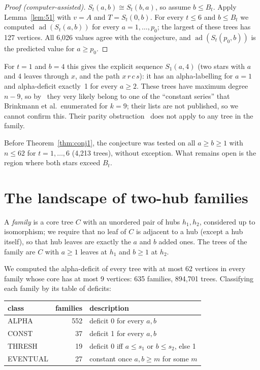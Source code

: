 \documentclass[11pt]{amsart}
\theoremstyle{definition}
\newcommand{\ad}{\operatorname{ad}}
\begin{document}
\begin{proof}[Proof (computer-assisted)]
$S_t(a,b)\cong S_t(b,a)$, so assume $b\le B_t$. Apply Lemma~\ref{lem:51} with $v=A$ and $T=S_t(0,b)$. For every
$t\le 6$ and $b\le B_t$ we computed $\ad(S_t(a,b))$ for every $a=1,\dots,p_0$; the largest of these trees has
127 vertices. All 6{,}026 values agree with the conjecture, and $\ad(S_t(p_0,b))$ is the predicted value for
$a\ge p_0$.
\end{proof}

For $t=1$ and $b=4$ this gives the explicit sequence $S_1(a,4)$ (two stars with $a$ and $4$ leaves through $x$,
and the path $x\,r\,c\,s$): it has an alpha-labelling for $a=1$ and alpha-deficit exactly~1 for every $a\ge 2$.
These trees have maximum degree $n-9$, so by~\cite[Theorem~1.2]{bcmrs} they very likely belong to one of the
``constant series'' that Brinkmann et al.\ enumerated for $k=9$; their lists are not published, so we cannot
confirm this. Their parity obstruction~\cite[Section~4]{bcmrs} does not apply to any tree in the family.

Before Theorem~\ref{thm:conj1}, the conjecture was tested on all $a\ge b\ge 1$ with $n\le 62$ for $t=1,\dots,6$
(4{,}213 trees), without exception. What remains open is the region where both stars exceed $B_t$.

\section{The landscape of two-hub families}\label{sec:landscape}

A \emph{family} is a core tree $C$ with an unordered pair of hubs $h_1,h_2$, considered up to isomorphism; we
require that no leaf of $C$ is adjacent to a hub (except a hub itself), so that hub leaves are exactly the $a$
and $b$ added ones. The trees of the family are $C$ with $a\ge1$ leaves at $h_1$ and $b\ge 1$ at $h_2$.

We computed the alpha-deficit of every tree with at most 62 vertices in every family whose core has at most 9
vertices: 635 families, 894{,}701 trees. Classifying each family by its table of deficits:

\begin{center}
\begin{tabular}{lrl}
\toprule
class & families & description\\
\midrule
ALPHA & 552 & deficit 0 for every $a,b$\\
CONST & 37 & deficit 1 for every $a,b$\\
THRESH & 19 & deficit 0 iff $a\le s_1$ or $b\le s_2$, else 1\\
EVENTUAL & 27 & constant once $a,b\ge m$ for some $m$\\
\bottomrule
\end{tabular}
\end{center}
\end{document}
